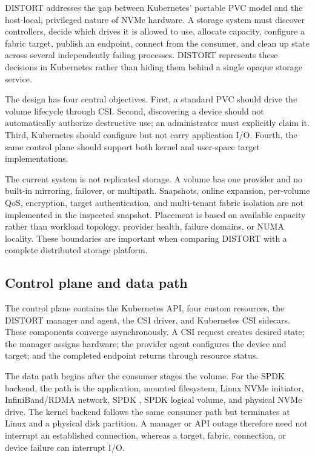 \documentclass[10pt,a4paper,twocolumn]{article}
\newcommand{\distort}{DISTORT}
\newcommand{\code}[1]{\texttt{\detokenize{#1}}}
\begin{document}
\distort{} addresses the gap between Kubernetes' portable PVC model and the
host-local, privileged nature of NVMe hardware. A storage system must discover
controllers, decide which drives it is allowed to use, allocate capacity,
configure a fabric target, publish an endpoint, connect from the consumer, and
clean up state across several independently failing processes. \distort{}
represents these decisions in Kubernetes rather than hiding them behind a
single opaque storage service.

The design has four central objectives. First, a standard PVC should drive the
volume lifecycle through CSI. Second, discovering a device should not
automatically authorize destructive use; an administrator must explicitly
claim it. Third, Kubernetes should configure but not carry application I/O.
Fourth, the same control plane should support both kernel and user-space target
implementations.

The current system is not replicated storage. A volume has one provider and no
built-in mirroring, failover, or multipath. Snapshots, online expansion,
per-volume QoS, encryption, target authentication, and multi-tenant fabric
isolation are not implemented in the inspected snapshot. Placement is based on
available capacity rather than workload topology, provider health, failure
domains, or NUMA locality. These boundaries are important when comparing
\distort{} with a complete distributed storage platform.

\subsection{Control plane and data path}

The control plane contains the Kubernetes API, four custom resources, the
\distort{} manager and agent, the CSI driver, and Kubernetes CSI sidecars.
These components converge asynchronously. A CSI request creates desired state;
the manager assigns hardware; the provider agent configures the device and
target; and the completed endpoint returns through resource status.

The data path begins after the consumer stages the volume. For the SPDK
backend, the path is the application, mounted filesystem, Linux NVMe
initiator, InfiniBand/RDMA network, SPDK \code{nvmf_tgt}, SPDK logical volume,
and physical NVMe drive. The kernel backend follows the same consumer path but
terminates at Linux \code{nvmet} and a physical disk partition. A manager or
API outage therefore need not interrupt an established connection, whereas a
target, fabric, connection, or device failure can interrupt I/O.
\end{document}
